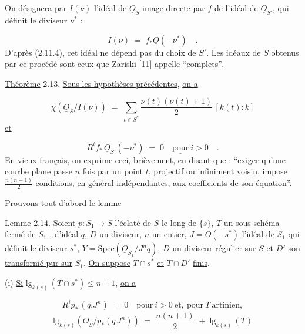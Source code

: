 On désignera par $I(\nu)$ l'idéal de $\underline{O}_S$ image directe par $f$ de l'idéal de $\underline{O}_{S'}$, qui définit le diviseur $\nu^*$ :

\begin{equation*}
I(\nu) \;=\; f_*\underline{O}(-\nu^*) \quad .
\end{equation*}
D'après (2.11.4), cet idéal ne dépend pas du choix de $S'$. Les idéaux de $S$ obtenus par ce procédé sont ceux que Zariski [11] appelle ``complets''.

\underline{Théorème} 2.13. \underline{Sous les hypothèses précédentes}, \underline{on a}

\begin{equation*}
\chi(\underline{O}_S/I(\nu)) \;=\; \sum_{t \in S^*} \frac{\nu(t)(\nu(t)+1)}{2}\,[k(t) : k]
\end{equation*}
\underline{et}

\begin{equation*}
R^i f_*\,\underline{O}_{S'}(-\nu^*) \;=\; 0 \quad \underline{\mathrm{pour}}\ i > 0 \quad .
\end{equation*}
En vieux français, on exprime ceci, brièvement, en disant que : ``exiger qu'une courbe plane passe $n$ fois par un point $t$, projectif ou infiniment voisin, impose $\frac{n(n+1)}{2}$ conditions, en général indépendantes, aux coefficients de son équation''.

Prouvons tout d'abord le lemme

\underline{Lemme} 2.14. \underline{Soient} $p : S_1 \longrightarrow S$ \underline{l'éclaté de} $S$ \underline{le long de} $\{s\}$, $T$ \underline{un sous-schéma fermé de} $S_1$ , \underline{d'idéal} $q$, $D$ \underline{un diviseur}, $n$ \underline{un entier}, $J = O(-s^*)$ \underline{l'idéal de} $S_1$ \underline{qui définit le diviseur} $s^*$, $Y = \mathrm{Spec}(\underline{O}_{S_1}/J^n q)$, $D$ \underline{un diviseur régulier sur} $S$ \underline{et} $D'$ \underline{son transformé pur sur} $S_1$. \underline{On suppose} $T \cap s^*$ \underline{et} $T \cap D'$ \underline{finis}.

(i) \underline{Si} $\mathrm{lg}_{k(s)}\,(T \cap s^*) \leq n +1$, \underline{on a}

\begin{equation*}
R^i p_*\,(q.J^n) \;=\; 0 \quad \underline{\mathrm{pour}}\ i > 0 \ \underline{\mathrm{et}},\ \underline{\mathrm{pour}}\ T\ \underline{\mathrm{artinien}},
\end{equation*}
\begin{equation*}
\mathrm{lg}_{k(s)}(\underline{O}_S/p_*(q\,J^n)) \;=\; \frac{n(n+1)}{2} \;+\; \mathrm{lg}_{k(s)}\,(T)
\end{equation*}

